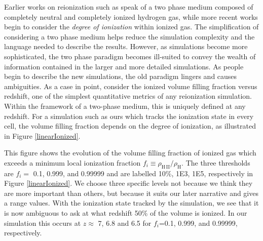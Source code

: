 Earlier works on reionization such as \cite{ValageasSilk1999,Gnedin2000,MiraldaEscudeEtAl2000,IlievEtAl2006} speak of a two phase medium composed of completely neutral and completely ionized hydrogen gas, while more recent works \citep{CiardiEtAl2003,ZahnEtAl2007,ShinEtAl2008,PetkovaSpringel2011a,FinlatorEtAl2012} begin to consider the {\em degree of ionization} within ionized gas.  The simplification of considering a two phase medium helps reduce the simulation complexity and the language needed to describe the results.  However, as simulations become more sophisticated, the two phase paradigm becomes ill-suited to convey the wealth of information contained in the larger and more detailed simulations.  
As people begin to describe the new simulations, the old paradigm lingers and causes ambiguities. As a case in point, consider the ionized volume filling fraction versus redshift, one of the simplest quantitative metrics of any reionization simulation. Within the framework of a two-phase medium, this is uniquely defined at any redshift. For a simulation such as ours which tracks the ionization state in every cell, the volume filling fraction depends on the degree of ionization, as illustrated in Figure \ref{linearIonized}. 


This figure shows the evolution of the volume filling fraction of ionized gas which exceeds a minimum local ionization fraction $f_i \equiv \rho_\mathrm{H\,II}/\rho_\mathrm{H}$. The three thresholds are $f_i=$ 0.1, 0.999, and 0.99999 and are labelled 10\%, 1E3, 1E5, respectively in Figure \ref{linearIonized}. 
We choose three specific levels not because we think they are more important than others, but because it suits our later narrative and gives a range values.  With the ionization state tracked by the simulation, we see that it is now ambiguous to ask at what redshift 50\% of the volume is ionized. In our simulation this occurs at $z \approx$ 7, 6.8 and 6.5 for $f_i$=0.1, 0.999, and 0.99999, respectively.

